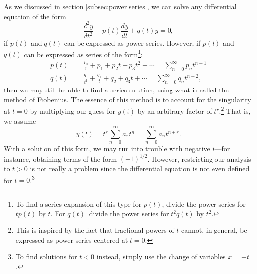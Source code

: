 \documentclass{myart}
\newcommand{\deriv}[3][]{\frac{d^{#1}#2}{d#3^{#1}}}
\begin{document}
As we discussed in section \ref{subsec:power series}, we can solve any
differential equation of the form
\begin{equation} \label{eq:frobenius homogeneous}
  \deriv[2]{y}{t} + p(t) \deriv{y}{t} + q(t) y = 0,
\end{equation}
if $p(t)$ and $q(t)$ can be expressed as power series. However, if
$p(t)$ and $q(t)$ can be expressed as series of the form\footnote{To
  find a series expansion of this type for $p(t)$, divide the power
  series for $tp(t)$ by $t$. For $q(t)$, divide the power series for
  $t^2q(t)$ by $t^2$.}:
\begin{align*}
  p(t) &= \frac{p_0}{t} + p_1 + p_2t + p_3t^2 + \cdots
        = \sum_{n=0}^\infty p_n t^{n-1} \\
  q(t) &= \frac{q_0}{t^2} + \frac{q_1}{t} + q_2 + q_3t + \cdots
        = \sum_{n=0}^\infty q_n t^{n-2},
\end{align*}
then we may still be able to find a series solution, using what is
called the method of Frobenius. The essence of this method is to
account for the singularity at $t = 0$ by multiplying our guess for
$y(t)$ by an arbitrary factor of $t^r$.\footnote{This is inspired by
  the fact that fractional powers of $t$ cannot, in general, be
  expressed as power series centered at $t = 0$.} That is, we assume
\begin{equation*}
  y(t) = t^r \sum_{n=0}^\infty a_n t^n = \sum_{n=0}^\infty a_n t^{n + r}.
\end{equation*}
With a solution of this form, we may run into trouble with negative
$t$---for instance, obtaining terms of the form $(-1)^{1/2}$. However,
restricting our analysis to $t > 0$ is not really a problem since the
differential equation is not even defined for $t = 0$.\footnote{To
  find solutions for $t < 0$ instead, simply use the change of
  variables $x = -t$.}
\end{document}
